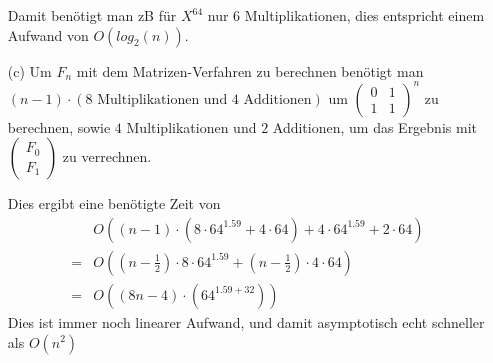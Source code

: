 \documentclass{article}
\begin{document}
\begin{enumerate}
Damit benötigt man zB für $X^{64}$ nur 6 Multiplikationen, 
dies entspricht einem Aufwand von $O(log_2(n))$.

\item[(c)]
Um $F_n$ mit dem Matrizen-Verfahren zu berechnen benötigt man 
$(n-1) \cdot (8 \text{ Multiplikationen und } 4 \text{ Additionen})$ 
um $\begin{pmatrix} 0 & 1 \\ 1 & 1 \end{pmatrix}^n$ zu berechnen, 
sowie $4$ Multiplikationen und $2$ Additionen, um das Ergebnis mit 
$\begin{pmatrix} F_0 \\ F_1 \end{pmatrix}$ zu verrechnen. 

Dies ergibt eine benötigte Zeit von 
\begin{align*}
&O((n-1) \cdot (8 \cdot 
64^{1.59} + 4 \cdot 64)+ 4 \cdot 64^{1.59} + 2 \cdot 64) \\ = 
&O((n-\frac{1}{2}) \cdot 8 \cdot 64^{1.59} + (n-\frac{1}{2})\cdot 4 \cdot 64) \\ 
= &O((8n-4)\cdot (64^{1.59 + 32}))
\end{align*}  
Dies ist immer noch linearer Aufwand, und damit asymptotisch 
echt schneller als $O(n^2)$
\end{enumerate}
\end{document}
